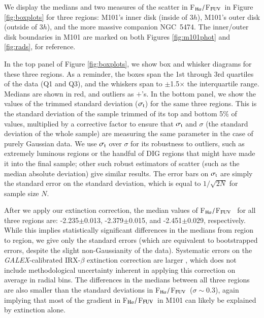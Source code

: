 \documentclass[iop]{emulateapj}
\newcommand{\hafuv}{F$_{\rm H\alpha}/$F$_{\rm FUV}$}
\begin{document}
We display the medians and two measures of the scatter in \hafuv \ in
Figure \ref{fig:boxplots} for three regions: M101's
inner disk (inside of $3h$), M101's outer disk (outside of $3h$), and
the more massive companion NGC~5474.  The inner/outer disk
boundaries in M101 are marked on both Figures \ref{fig:m101phot} and
\ref{fig:rads}, for reference.

In the top panel of Figure \ref{fig:boxplots}, we show box and
whisker diagrams for these three regions.  As a reminder, the boxes
span the 1st through 3rd quartiles of the data (Q1 and Q3), and the
whiskers span to $\pm$1.5$\times$ the interquartile range.  Medians
are shown in red, and outliers as $+$'s.  In the bottom panel, we show
the values of the trimmed standard deviation ($\sigma_{\rm t}$) for the
same three regions.  This is the standard deviation of the sample
trimmed of its top and bottom 5\% of values, multiplied by a
corrective factor \citep[$1/0.789$ for 5\% trimming;][]{breiman73,
  huber81, morrison90} to ensure that $\sigma_{\rm t}$ and $\sigma$ (the
standard deviation of the whole sample) are measuring the same
parameter in the case of purely Gaussian data.  We use $\sigma_{\rm t}$
over $\sigma$ for its robustness to outliers, such as extremely
luminous  regions or the handful of DIG regions that might
have made it into the final sample; other such robust estimators of
scatter (such as the median absolute deviation) give similar results.
The error bars on $\sigma_{\rm t}$ are simply the standard error on the
standard deviation, which is equal to $1/\sqrt{2N}$ for sample size
$N$.

After we apply our extinction correction, the median values of \hafuv
\ for all three regions are: -2.235$\pm$0.013, -2.379$\pm$0.015, and
-2.451$\pm$0.029, respectively.  While this implies statistically
significant differences in the medians from region to region, we give
only the standard errors (which are equivalent to bootstrapped errors,
despite the slight non-Gaussianity of the data).  Systematic errors on
the \emph{GALEX}-calibrated IRX-$\beta$ extinction correction are
larger \citep[of order 0.1 mag, excluding uncertainties in the
  transformation from FUV$-$NUV color to $\beta$;][]{cortese06},
which does not include methodological uncertainty inherent in applying
this correction on average in radial bins.  The differences in the
medians between all three regions are also smaller than the standard
deviations in \hafuv \ ($\sigma \sim 0.3$), again implying that most
of the gradient in \hafuv \ in M101 can likely be explained by
extinction alone.
\end{document}
